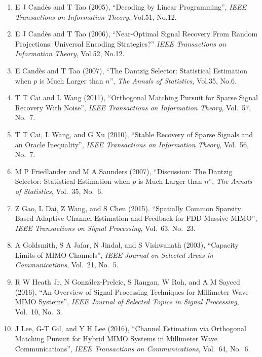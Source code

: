 \documentclass[12pt]{article}
\begin{document}
\begin{enumerate}
\item E J Cand\`es and T Tao (2005), ``Decoding by Linear Programming'', \textit{IEEE Transactions on Information Theory}, Vol.51, No.12.

\item E J Cand\`es and T Tao (2006), ``Near-Optimal Signal Recovery From Random Projections: Universal Encoding Strategies?'' \textit{IEEE Transactions on Information Theory}, Vol.52, No.12.

\item E Cand\`es and T Tao (2007), ``The Dantzig Selector: Statistical Estimation when \(p\) is Much Larger than \(n\)'', \textit{The Annals of Statistics}, Vol.35, No.6.

\item T T Cai and L Wang (2011), ``Orthogonal Matching Pursuit for Sparse Signal Recovery With Noise'', \textit{IEEE Transactions on Information Theory}, Vol.\ 57, No.\ 7.

\item T T Cai, L Wang, and G Xu (2010), ``Stable Recovery of Sparse Signals and an Oracle Inequality'', \textit{IEEE Transactions on Information Theory}, Vol.\ 56, No.\ 7.

\item M P Friedlander and M A Saunders (2007), ``Discussion: The Dantzig Selector: Statistical Estimation when \(p\) is Much Larger than \(n\)'', \textit{The Annals of Statistics}, Vol.\ 35, No.\ 6.

\item Z Gao, L Dai, Z Wang, and S Chen (2015). ``Spatially Common Sparsity Based Adaptive Channel Estimation and Feedback for FDD Massive MIMO'', \textit{IEEE Transactions on Signal Processing}, Vol.\ 63, No.\ 23.

\item A Goldsmith, S A Jafar, N Jindal, and S Vishwanath (2003), ``Capacity Limits of MIMO Channels'', \textit{IEEE Journal on Selected Areas in Communications}, Vol.\ 21, No.\ 5.

\item R W Heath Jr, N González-Prelcic, S Rangan, W Roh, and A M Sayeed (2016), ``An Overview of Signal Processing Techniques for Millimeter Wave MIMO Systems'', \textit{IEEE Journal of Selected Topics in Signal Processing}, Vol.\ 10, No.\ 3.

\item J Lee, G-T Gil, and Y H Lee (2016), ``Channel Estimation via Orthogonal Matching Pursuit for Hybrid MIMO Systems in Millimeter Wave Communications'', \textit{IEEE Transactions on Communications}, Vol.\ 64, No.\ 6.


\end{enumerate}
\end{document}

